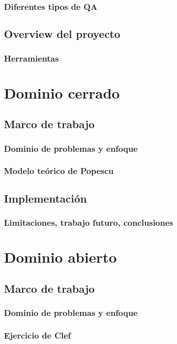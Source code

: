 \documentclass{beamer}
\begin{document}
\subsubsection*{Diferentes tipos de QA}
\subsection{Overview del proyecto}
\subsubsection*{Herramientas}

\section{Dominio cerrado}
\subsection{Marco de trabajo}
\subsubsection*{Dominio de problemas y enfoque}
\subsubsection*{Modelo teórico de Popescu}
\subsection{Implementación}
\subsubsection*{Limitaciones, trabajo futuro, conclusiones}
\section{Dominio abierto}
\subsection{Marco de trabajo}
\subsubsection*{Dominio de problemas y enfoque}
\subsubsection*{Ejercicio de Clef}
\end{document}
